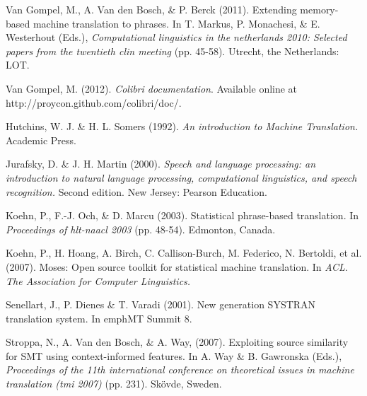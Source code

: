 \documentclass[12pt]{article}
\begin{document}
\begin{thebibliography}{99}
Van Gompel, M., A. Van den Bosch, \& P. Berck (2011). Extending memory-based
machine translation to phrases. In T. Markus, P. Monachesi, \& E. Westerhout (Eds.), \emph{Computational linguistics in the netherlands 2010: Selected papers from the twentieth clin meeting} (pp. 45-58). Utrecht, the Netherlands: LOT.

Van Gompel, M. (2012). \emph{Colibri documentation}. Available online at http://proycon.github.com/colibri/doc/.

Hutchins, W. J. \& H. L. Somers (1992). \emph{An introduction to Machine Translation.} Academic Press.

Jurafsky, D. \& J. H. Martin (2000). \emph{Speech and language processing: an introduction to natural language processing, computational linguistics, and speech recognition.} Second edition. New Jersey: Pearson Education.

Koehn, P., F.-J. Och, \& D. Marcu (2003). Statistical phrase-based translation. In \emph{Proceedings of hlt-naacl 2003} (pp. 48-54). Edmonton, Canada.

Koehn, P., H. Hoang, A. Birch, C. Callison-Burch, M. Federico, N. Bertoldi, et al. (2007). Moses: Open source toolkit for statistical machine translation. In \emph{ACL. The Association for Computer Linguistics.}

Senellart, J., P. Dienes \& T. Varadi (2001). New generation SYSTRAN translation system. In emph{MT Summit 8}.

Stroppa, N., A. Van den Bosch, \& A. Way, (2007). Exploiting source similarity for SMT using context-informed features. In A. Way \& B. Gawronska (Eds.), \emph{Proceedings of the 11th international conference on theoretical issues in machine translation (tmi 2007)} (pp. 231). Skövde, Sweden.

\end{thebibliography}
\end{document}
